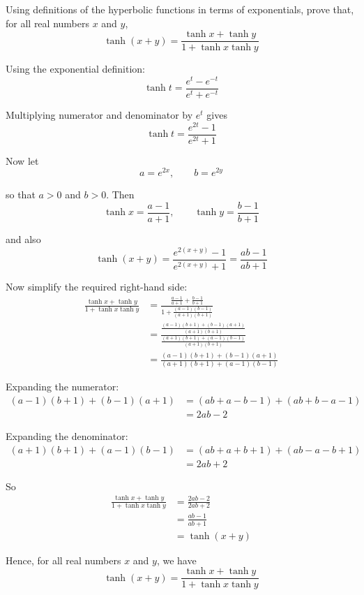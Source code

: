 \documentclass[leqno]{article}
\begin{document}
\begin{enumerate}[
  label=\textbf{\arabic*.},
  leftmargin=*,
  topsep=0pt,
  partopsep=0pt,
  parsep=0pt
]
Using definitions of the hyperbolic functions in terms of exponentials, prove that, for all real numbers $x$ and $y$,
\[
\tanh(x+y)=\frac{\tanh x+\tanh y}{1+\tanh x\tanh y}
\]

\vspace*{10pt}

\begin{djsSolution}
Using the exponential definition:
\[
\tanh t=\frac{e^t-e^{-t}}{e^t+e^{-t}}
\]

Multiplying numerator and denominator by $e^t$ gives
\[
\tanh t=\frac{e^{2t}-1}{e^{2t}+1}
\]

Now let
\[
a=e^{2x}, \qquad b=e^{2y}
\]

so that $a>0$ and $b>0$. Then
\[
\tanh x=\frac{a-1}{a+1},\qquad \tanh y=\frac{b-1}{b+1}
\]

and also
\[
\tanh(x+y)=\frac{e^{2(x+y)}-1}{e^{2(x+y)}+1}=\frac{ab-1}{ab+1}
\]

Now simplify the required right-hand side:
\begin{align*}
\frac{\tanh x+\tanh y}{1+\tanh x\tanh y}
&=
\frac{\frac{a-1}{a+1}+\frac{b-1}{b+1}}{1+\frac{(a-1)(b-1)}{(a+1)(b+1)}}\\
&=
\frac{\frac{(a-1)(b+1)+(b-1)(a+1)}{(a+1)(b+1)}}{\frac{(a+1)(b+1)+(a-1)(b-1)}{(a+1)(b+1)}}\\
&=
\frac{(a-1)(b+1)+(b-1)(a+1)}{(a+1)(b+1)+(a-1)(b-1)}
\end{align*}

Expanding the numerator:
\begin{align*}
(a-1)(b+1)+(b-1)(a+1)
&=(ab+a-b-1)+(ab+b-a-1)\\
&=2ab-2
\end{align*}

Expanding the denominator:
\begin{align*}
(a+1)(b+1)+(a-1)(b-1)
&=(ab+a+b+1)+(ab-a-b+1)\\
&=2ab+2
\end{align*}

So
\begin{align*}
\frac{\tanh x+\tanh y}{1+\tanh x\tanh y}
&=\frac{2ab-2}{2ab+2}\\
&=\frac{ab-1}{ab+1}\\
&=\tanh(x+y)
\end{align*}

Hence, for all real numbers $x$ and $y$, we have
\[
\tanh(x+y)=\frac{\tanh x+\tanh y}{1+\tanh x\tanh y}
\]
\end{djsSolution}


\newpage


\end{enumerate}
\end{document}
